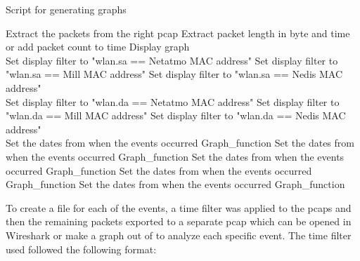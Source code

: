 \begin{algorithm}[H]
\caption{Script for generating graphs}\label{alg:GraphScript}
    \begin{algorithmic}[1]
         
            \State Extract the packets from the right pcap
                \State Extract packet length in byte and time or add packet count to time
                \State Display graph
            \EndFor
        \EndFor {}\\
         
                \State Set display filter to "wlan.sa == Netatmo MAC address"
                \State Set display filter to "wlan.sa == Mill MAC address"
                \State Set display filter to "wlan.sa == Nedis MAC address"    
            \EndIf \\
         
                \State Set display filter to "wlan.da == Netatmo MAC address"
                \State Set display filter to "wlan.da == Mill MAC address"
                \State Set display filter to "wlan.da == Nedis MAC address"  
            \EndIf
        \EndIf \\
         
            \State Set the dates from when the events occurred 
            \State Graph\_function
            \State Set the dates from when the events occurred 
            \State Graph\_function
            \State Set the dates from when the events occurred 
            \State Graph\_function
            \State Set the dates from when the events occurred 
            \State Graph\_function
            \State Set the dates from when the events occurred 
            \State Graph\_function
        \EndIf {}
    \end{algorithmic}
\end{algorithm}

To create a file for each of the events, a time filter was applied to the pcaps and then the remaining packets exported to a separate pcap which can be opened in Wireshark or make a graph out of to analyze each specific event. The time filter used followed the following format:


